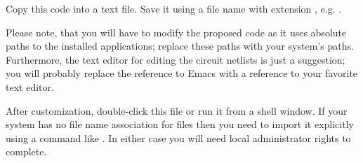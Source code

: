 Copy this code into a text file. Save it using a file name with extension
, e.g. .

Please note, that you will have to modify the proposed code as it uses
absolute paths to the installed applications; replace these paths with
your system's paths. Furthermore, the text editor for editing the circuit
netlists is just a suggestion; you will probably replace the reference to
Emacs with a reference to your favorite text editor.

After customization, double-click this file or run it from a shell window.
If your system has no file name association for  files then
you need to import it explicitly using a command like . In either case you will need local administrator rights
to complete.